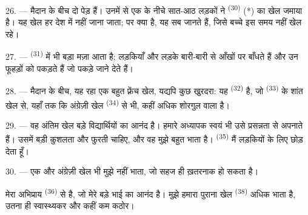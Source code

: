 
26. --- मैदान के बीच दो पेड़ हैं। उनमें से एक के नीचे सात-आठ लड़कों ने
 \textsuperscript{(30)} (*) का खेल जमाया है। यह खेल हर देश में
नहीं जाना जाता; पर  क्या है, यह सब जानते हैं, जिसे बच्चे इस
समय नहीं खेल रहे।

\VUsaut{5.0mm}
\VUsaut{3.4mm}

27. ---  \textsuperscript{(31)} में भी बड़ा मज़ा आता है;
लड़कियाँ और लड़के बारी-बारी से आँखों पर  बाँधते हैं और उन
फूहड़ों को पकड़ते हैं जो पकड़े जाने देते हैं।

28. --- मैदान के बीच, यह रहा एक बहुत फ़्रेंच खेल, यद्यपि कुछ खुरदरा: यह
 \textsuperscript{(32)} है, जो  \textsuperscript{(33)} के
शांत खेल से, यहाँ तक कि अंग्रेज़ी खेल  \textsuperscript{(34)} से भी,
कहीं अधिक शोरगुल वाला है।

29. --- वह अंतिम खेल बड़े विद्यार्थियों का आनंद है। हमारे अध्यापक स्वयं भी उसे
प्रसन्नता से अपनाते हैं। उसमें बड़ी कुशलता और फुरती चाहिए, और वह मुझे बहुत
भाता है।  \textsuperscript{(35)} मैं लड़कियों के लिए छोड़ देता हूँ।

30. --- एक और अंग्रेज़ी खेल भी मुझे नहीं भाता, जो सहज ही ख़तरनाक हो सकता है।

मेरा अभिप्राय  \textsuperscript{(36)} से है, जो मेरे बड़े भाई का
आनंद है। मुझे हमारा पुराना खेल  \textsuperscript{(38)} अधिक
भाता है, उतना ही स्वास्थ्यकर और कहीं कम कठोर।

